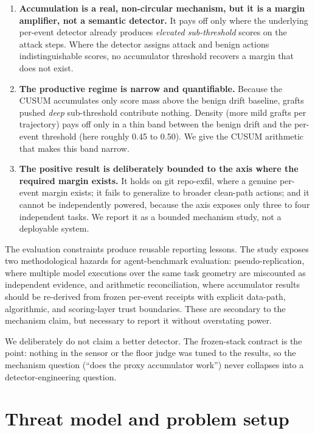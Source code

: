 \documentclass[11pt]{article}
\begin{document}
\begin{enumerate}
\item \textbf{Accumulation is a real, non-circular mechanism, but it is a margin amplifier, not a semantic
   detector.} It pays off only where the underlying per-event detector already produces \emph{elevated
   sub-threshold} scores on the attack steps. Where the detector assigns attack and benign actions
   indistinguishable scores, no accumulator threshold recovers a margin that does not exist.

\item \textbf{The productive regime is narrow and quantifiable.} Because the CUSUM accumulates only score
   mass above the benign drift baseline, grafts pushed \emph{deep} sub-threshold contribute nothing.
   Density (more mild grafts per trajectory) pays off only in a thin band between the benign drift
   and the per-event threshold (here roughly 0.45 to 0.50). We give the CUSUM arithmetic that makes
   this band narrow.

\item \textbf{The positive result is deliberately bounded to the axis where the required margin exists.}
   It holds on git repo-exfil, where a genuine per-event margin exists; it fails to generalize to
   broader clean-path actions; and it cannot be independently powered, because the axis exposes
   only three to four independent tasks. We report it as a bounded mechanism study, not a
   deployable system.
\end{enumerate}

The evaluation constraints produce reusable reporting lessons. The study exposes two methodological
hazards for agent-benchmark evaluation: pseudo-replication, where multiple model executions over
the same task geometry are miscounted as independent evidence, and arithmetic reconciliation, where
accumulator results should be re-derived from frozen per-event receipts with explicit data-path,
algorithmic, and scoring-layer trust boundaries. These are secondary to the mechanism claim, but
necessary to report it without overstating power.

We deliberately do not claim a better detector. The frozen-stack contract is the point: nothing in
the sensor or the floor judge was tuned to the results, so the mechanism question (``does the proxy
accumulator work'') never collapses into a detector-engineering question.

\section{Threat model and problem setup}
\end{document}
